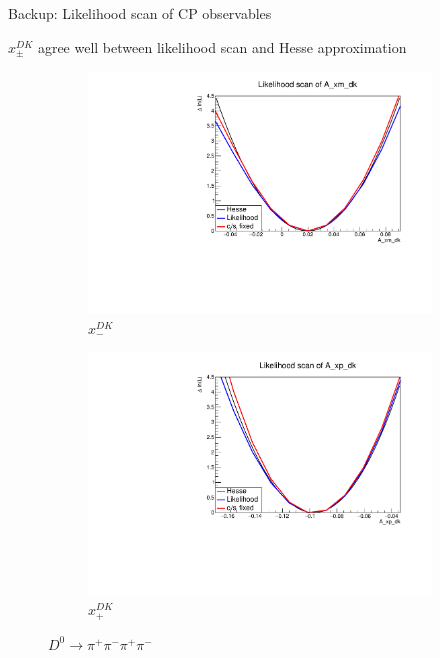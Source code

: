 \documentclass[xcolor={dvipsnames}]{beamer}
\begin{document}
\begin{frame}{Backup: Likelihood scan of CP observables}
  \begin{center}
    $x_\pm^{DK}$ agree well between likelihood scan and Hesse approximation
  \end{center}
  \begin{figure}
    \centering
    \begin{subfigure}{0.5\textwidth}
      \centering
      \includegraphics[width=1.0\textwidth]{Plots/A_xm_dk_likelihood_scan_pipipipi.pdf}
      \vspace{-0.3cm}
      \caption*{$x_-^{DK}$}
    \end{subfigure}%
    \begin{subfigure}{0.5\textwidth}
      \centering
      \includegraphics[width=1.0\textwidth]{Plots/A_xp_dk_likelihood_scan_pipipipi.pdf}
      \vspace{-0.3cm}
      \caption*{$x_+^{DK}$}
    \end{subfigure}
    \caption*{$D^0\to\pi^+\pi^-\pi^+\pi^-$}
  \end{figure}
\end{frame}
\end{document}

